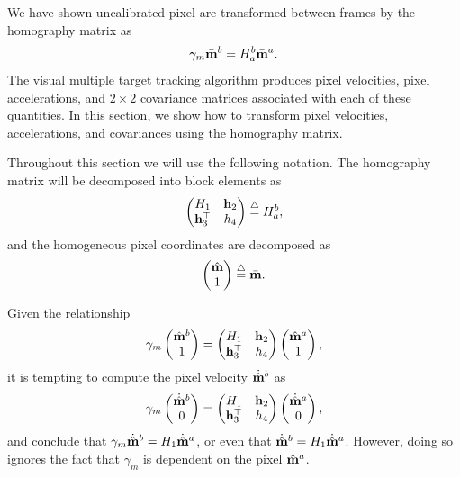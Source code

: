 We have shown uncalibrated pixel are transformed between frames by the homography matrix as
\[
\gamma_m \bar{\mathbf{m}}^b = H_a^b \bar{\mathbf{m}}^a.
\]
The visual multiple target tracking algorithm produces pixel velocities, pixel accelerations, and $2\times 2$ covariance matrices associated with each of these quantities.  In this section, we show how to transform pixel velocities, accelerations, and covariances using the homography matrix.  

Throughout this section we will use the following notation.  The homography matrix will be decomposed into block elements as
\[
\begin{pmatrix} H_1 & \mathbf{h}_2 \\ \mathbf{h}_3^\top & h_4 \end{pmatrix} \stackrel{\triangle}{=} H_a^b,
\]
and the homogeneous pixel coordinates are decomposed as
\[
\begin{pmatrix} \hat{\mathbf{m}} \\ 1 \end{pmatrix} \stackrel{\triangle}{=} \bar{\mathbf{m}}.
\]

Given the relationship 
\[
\gamma_m \begin{pmatrix}\hat{\mathbf{m}}^b \\ 1 \end{pmatrix} = \begin{pmatrix} H_1 & \mathbf{h}_2 \\ \mathbf{h}_3^\top & h_4 \end{pmatrix} \begin{pmatrix} \hat{\mathbf{m}}^a \\ 1 \end{pmatrix},
\]
it is tempting to compute the pixel velocity $\dot{\hat{\mathbf{m}}}^b$ as
\[
\gamma_m\begin{pmatrix}\dot{\hat{\mathbf{m}}}^b \\ 0 \end{pmatrix} = \begin{pmatrix} H_1 & \mathbf{h}_2 \\ \mathbf{h}_3^\top & h_4 \end{pmatrix} \begin{pmatrix} \dot{\hat{\mathbf{m}}}^a \\ 0 \end{pmatrix},
\]
and conclude that $\gamma_m \dot{\hat{\mathbf{m}}}^b = H_1 \dot{\hat{\mathbf{m}}}^a$, or even that $\dot{\hat{\mathbf{m}}}^b = H_1 \dot{\hat{\mathbf{m}}}^a$.  However, doing so ignores the fact that $\gamma_m$ is dependent on the pixel $\hat{\mathbf{m}}^a$.  


